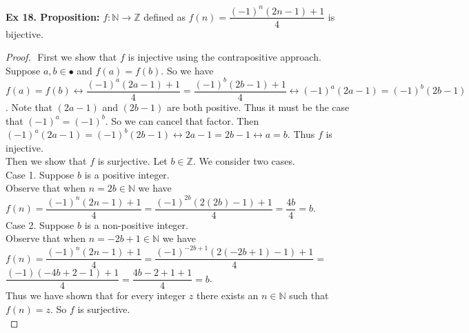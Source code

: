\documentclass{article}
\begin{document}
\noindent \textbf{Ex 18. Proposition:} $f: \mathbb{N} \rightarrow \mathbb{Z}$ defined as $f(n)=\dfrac{(-1)^n(2n-1)+1}{4}$ is bijective.
\begin{proof}
$ $\newline
First we show that $f$ is injective using the contrapositive approach. Suppose $a, b \in \mathbb{•}$ and $f(a)=f(b)$. So we have $f(a)=f(b) \leftrightarrow \dfrac{(-1)^a(2a-1)+1}{4} = \dfrac{(-1)^b(2b-1)+1}{4} \leftrightarrow (-1)^a(2a-1)=(-1)^b(2b-1)$. Note that $(2a-1)$ and $(2b-1)$ are both positive. Thus it must be the case that $(-1)^a=(-1)^b$. So we can cancel that factor. Then $(-1)^a(2a-1)=(-1)^b(2b-1)\leftrightarrow 2a-1=2b-1 \leftrightarrow a=b$. Thus $f$ is injective.\\

\noindent Then we show that $f$ is surjective. Let $b \in \mathbb{Z}$. We consider two cases.\\

\noindent Case 1. Suppose $b$ is a positive integer.\\
\indent Observe that when $n=2b \in \mathbb{N}$ we have $f(n)=\dfrac{(-1)^n(2n-1)+1}{4}=\dfrac{(-1)^{2b}(2(2b)-1)+1}{4}=\dfrac{4b}{4}=b$.\\

\noindent Case 2. Suppose $b$ is a non-positive integer.\\
\indent Observe that when $n=-2b+1 \in \mathbb{N}$ we have $f(n)=\dfrac{(-1)^n(2n-1)+1}{4}=\dfrac{(-1)^{-2b+1}(2(-2b+1)-1)+1}{4}=$\\
\indent $\dfrac{(-1)(-4b+2-1)+1}{4}= \dfrac{4b-2+1+1}{4} = b$.\\

\noindent Thus we have shown that for every integer $z$ there exists an $n \in \mathbb{N}$ such that $f(n)=z$. So $f$ is surjective.\\
\end{proof}
\end{document}
